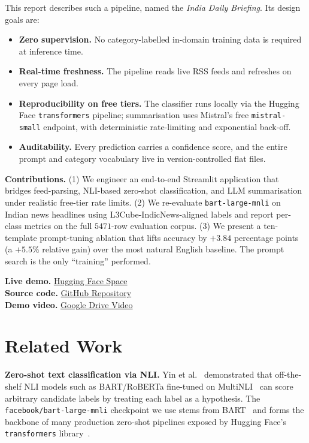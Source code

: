 \documentclass[10pt,twocolumn,letterpaper]{article}
\begin{document}
This report describes such a pipeline, named the \emph{India Daily Briefing}. Its design goals are:
\begin{itemize}
    \item \textbf{Zero supervision.} No category-labelled in-domain training data is required at inference time.
    \item \textbf{Real-time freshness.} The pipeline reads live RSS feeds and refreshes on every page load.
    \item \textbf{Reproducibility on free tiers.} The classifier runs locally via the Hugging Face \texttt{transformers} pipeline; summarisation uses Mistral's free \texttt{mistral-small} endpoint, with deterministic rate-limiting and exponential back-off.
    \item \textbf{Auditability.} Every prediction carries a confidence score, and the entire prompt and category vocabulary live in version-controlled flat files.
\end{itemize}

\noindent\textbf{Contributions.} (1) We engineer an end-to-end Streamlit application that bridges feed-parsing, NLI-based zero-shot classification, and LLM summarisation under realistic free-tier rate limits. (2) We re-evaluate \texttt{bart-large-mnli} on Indian news headlines using L3Cube-IndicNews-aligned labels and report per-class metrics on the full $5471$-row evaluation corpus. (3) We present a ten-template prompt-tuning ablation that lifts accuracy by $+3.84$ percentage points (a $+5.5\%$ relative gain) over the most natural English baseline. The prompt search is the only ``training'' performed.

\medskip
\noindent\textbf{Live demo.} \href{https://huggingface.co/spaces/piyukr26/SMAI_A3}{Hugging Face Space} \\
\textbf{Source code.} \href{https://github.com/XProtocol0/L3Cube-IndicNews-Classifier-Summarizer}{GitHub Repository} \\
\textbf{Demo video.} \href{https://drive.google.com/drive/folders/15FgeyxjyEIJubzcbA3jKG0MLjuL8n4sV?usp=sharing}{Google Drive Video}

\section{Related Work}
\label{sec:related}
\textbf{Zero-shot text classification via NLI.} Yin et al.~\cite{yin2019zeroshot} demonstrated that off-the-shelf NLI models such as BART/RoBERTa fine-tuned on MultiNLI~\cite{williams2018mnli} can score arbitrary candidate labels by treating each label as a hypothesis. The \texttt{facebook/bart-large-mnli} checkpoint we use stems from BART~\cite{lewis2020bart} and forms the backbone of many production zero-shot pipelines exposed by Hugging Face's \texttt{transformers} library~\cite{hf}.
\end{document}
